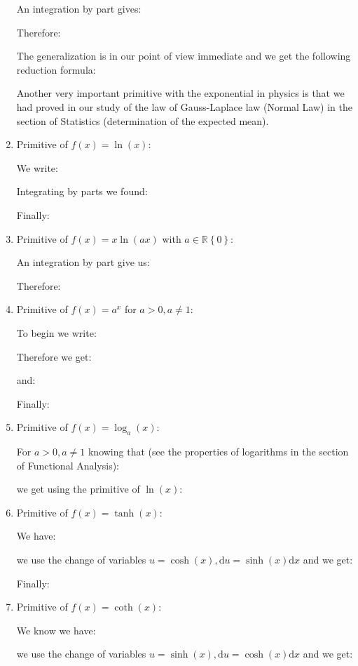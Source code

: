 \begin{enumerate}
		An integration by part gives:
		
		Therefore:
		
		The generalization is in our point of view immediate and we get the following reduction formula:
		
		\begin{tcolorbox}[title=Remark,colframe=black,arc=10pt]
		Another very important primitive with the exponential in physics is that we had proved in our study of the law of Gauss-Laplace law (Normal Law) in the section of Statistics (determination of the expected mean).
		\end{tcolorbox}
		\item Primitive of $f(x)=\ln(x)$:
		
		We write:
		
		Integrating by parts we found:
		
		Finally:
		
		\item Primitive of $f(x)=x\ln(ax)$ with $a\in \mathbb{R}\left\lbrace 0 \right\rbrace$:
		
		An integration by part give us:
		
		Therefore:
		
		\item Primitive of $f(x)=a^x$ for $a>0,a\neq 1$:
		
		To begin we write:
		
		Therefore we get:
		
		and:
		
		Finally:
		
		\item Primitive of $f(x)=\log_a(x)$:
		
		For $a>0,a\neq 1$ knowing that (see the properties of logarithms in the section of Functional Analysis):
		
		we get using the primitive of $\ln(x)$:
		
		\item Primitive of $f(x)=\tanh(x)$:
		
		We have:
		
		we use the change of variables $u=\cosh(x),\mathrm{d}u=\sinh(x)\mathrm{d}x$ and we get:
		
		Finally:
		
		\item Primitive of $f(x)=\coth(x)$:
		
		We know we have:
		
		we use the change of variables $u=\sinh(x),\mathrm{d}u=\cosh(x)\mathrm{d}x$ and we get:
		

\end{enumerate}
